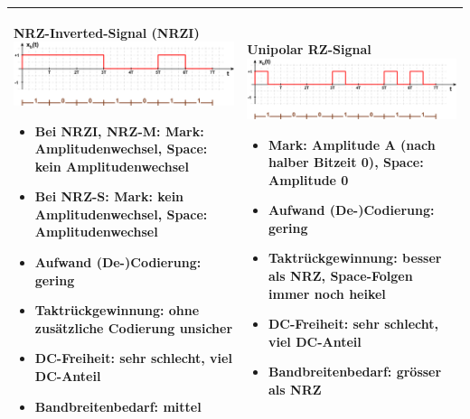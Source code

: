 \begin{longtable}{|p{9cm}|p{9cm}|}
	\textbf{NRZ-Inverted-Signal (NRZI)}\newline
	\includegraphics[width=8cm]{bilder/DigitaleBasisbandSignale/NRZInverted.png}\newline
	\begin{itemize}[noitemsep]
		\item \textbf{Bei NRZI, NRZ-M:} \textbf{Mark:} Amplitudenwechsel, \textbf{Space:} kein Amplitudenwechsel
		\item \textbf{Bei NRZ-S:} \textbf{Mark:} kein Amplitudenwechsel, \textbf{Space:} Amplitudenwechsel
		\item \textbf{Aufwand (De-)Codierung:} gering
		\item \textbf{Taktrückgewinnung:} ohne zusätzliche Codierung unsicher
		\item \textbf{DC-Freiheit:} sehr schlecht, viel DC-Anteil
		\item \textbf{Bandbreitenbedarf:} mittel
	\end{itemize}
	&
	\textbf{Unipolar RZ-Signal}\newline
	\includegraphics[width=8cm]{bilder/DigitaleBasisbandSignale/UnipolarRZ.png}\newline
	\begin{itemize}[noitemsep]
		\item \textbf{Mark:} Amplitude A (nach halber Bitzeit 0), \textbf{Space:} Amplitude 0
		\item \textbf{Aufwand (De-)Codierung:} gering
		\item \textbf{Taktrückgewinnung:} besser als NRZ, Space-Folgen immer noch heikel
		\item \textbf{DC-Freiheit:} sehr schlecht, viel DC-Anteil
		\item \textbf{Bandbreitenbedarf:} grösser als NRZ
	\end{itemize}\\
	
	\hline
	

\end{longtable}
